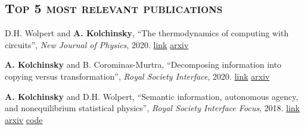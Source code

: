 \documentclass[margin,line,centered,12pt]{res}
\begin{document}
\begin{resume}






\section{\textsc{Top 5 most relevant publications}}

D.H. Wolpert and \textbf{A. Kolchinsky}, ``The thermodynamics of computing with circuits'', \emph{New Journal of Physics}, 2020. \href{https://iopscience.iop.org/article/10.1088/1367-2630/ab82b8}{link} \href{https://arxiv.org/abs/1806.04103}{arxiv}


\textbf{A. Kolchinsky} and B. Corominas-Murtra, 
``Decomposing information into copying versus transformation'', 
\emph{Royal Society Interface}, 2020. 
\href{https://royalsocietypublishing.org/doi/10.1098/rsif.2019.0623}{link}
\href{https://arxiv.org/abs/1903.10693}{arxiv}




\textbf{A. Kolchinsky} and D.H. Wolpert, 
``Semantic information, autonomous agency, and nonequilibrium statistical physics'', 
\emph{Royal Society Interface Focus}, 2018.
\href{http://rsfs.royalsocietypublishing.org/content/8/6/20180041}{link} 
\href{https://arxiv.org/abs/1806.08053}{arxiv} 
\href{https://github.com/artemyk/semantic_information/}{code}



\end{resume}
\end{document}
